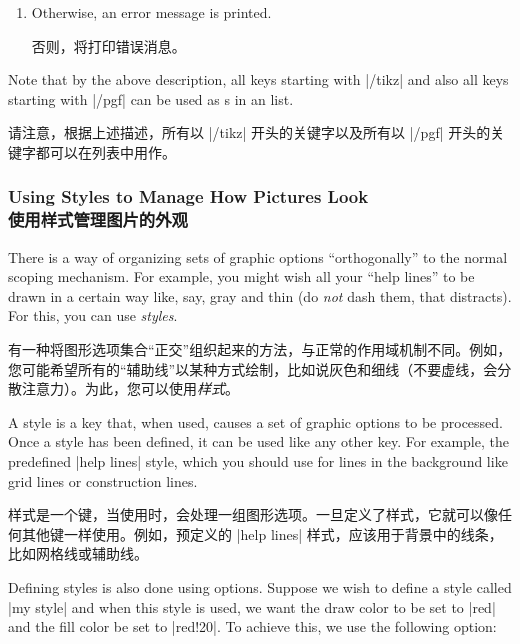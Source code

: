\begin{command}{\tikzset{}}
\begin{enumerate}
          否则，将检查 是否是形状的名称，如果是，则执行 |shape=|。
      \item Otherwise, an error message is printed.

      否则，将打印错误消息。
  \end{enumerate}

  Note that by the above description, all keys starting with |/tikz| and also
  all keys starting with |/pgf| can be used as s in an
   list.

  请注意，根据上述描述，所有以 |/tikz| 开头的关键字以及所有以 |/pgf| 开头的关键字都可以在列表中用作。
\end{command}


\subsubsection{Using Styles to Manage How Pictures Look\\使用样式管理图片的外观}

There is a way of organizing sets of graphic options ``orthogonally'' to the
normal scoping mechanism. For example, you might wish all your ``help lines''
to be drawn in a certain way like, say, gray and thin (do \emph{not} dash them,
that distracts). For this, you can use \emph{styles}.

有一种将图形选项集合“正交”组织起来的方法，与正常的作用域机制不同。例如，您可能希望所有的“辅助线”以某种方式绘制，比如说灰色和细线（不要虚线，会分散注意力）。为此，您可以使用\emph{样式}。

A style is a key that, when used, causes a set of graphic options to be
processed. Once a style has been defined, it can be used like any other key.
For example, the predefined |help lines| style, which you should use for lines
in the background like grid lines or construction lines.

样式是一个键，当使用时，会处理一组图形选项。一旦定义了样式，它就可以像任何其他键一样使用。例如，预定义的 |help lines| 样式，应该用于背景中的线条，比如网格线或辅助线。
%
\begin{codeexample}[]
\end{codeexample}

Defining styles is also done using options. Suppose we wish to define a style
called |my style| and when this style is used, we want the draw color to be set
to |red| and the fill color be set to |red!20|. To achieve this, we use the
following option:


